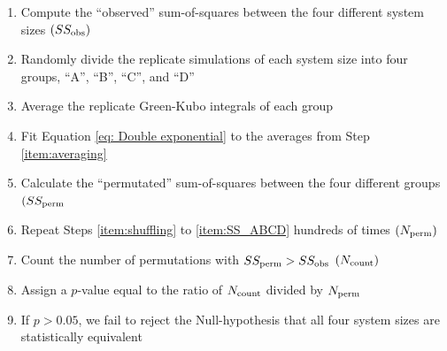 \documentclass[preprint,review,12pt]{elsarticle}
\begin{document}
	\begin{enumerate}
		\item Compute the ``observed'' sum-of-squares between the four different system sizes $(SS_{\rm obs})$
		\item Randomly divide the replicate simulations of each system size into four groups, ``A'', ``B'', ``C'', and ``D'' \label{item:shuffling}
		\item Average the replicate Green-Kubo integrals of each group \label{item:averaging}
		\item Fit Equation \ref{eq: Double exponential} to the averages from Step \ref{item:averaging} \label{item:fitting}
		\item Calculate the ``permutated'' sum-of-squares between the four different groups $(SS_{\rm perm}$ \label{item:SS_ABCD}
		\item Repeat Steps \ref{item:shuffling} to \ref{item:SS_ABCD} hundreds of times $(N_{\rm perm})$
		\item Count the number of permutations with $SS_{\rm perm} > SS_{\rm obs}$ $(N_{\rm count})$ \label{item:counting}
		\item Assign a $p$-value equal to the ratio of $N_{\rm count}$ divided by $N_{\rm perm}$
		\item If $p > 0.05$, we fail to reject the Null-hypothesis that all four system sizes are statistically equivalent 
	\end{enumerate}
	
     
\end{document}
